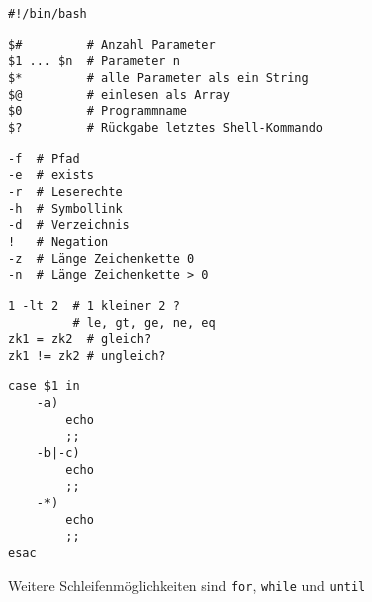 			\lstBash[1. Zeile]
			\begin{lstlisting}
#!/bin/bash
			\end{lstlisting}

			\begin{lstlisting}
$#         # Anzahl Parameter
$1 ... $n  # Parameter n
$*         # alle Parameter als ein String
$@         # einlesen als Array
$0         # Programmname
$?         # Rückgabe letztes Shell-Kommando
			\end{lstlisting}

			\begin{lstlisting}
-f  # Pfad
-e  # exists
-r  # Leserechte
-h  # Symbollink
-d  # Verzeichnis
!   # Negation
-z  # Länge Zeichenkette 0
-n  # Länge Zeichenkette > 0
			\end{lstlisting}

			\begin{lstlisting}
1 -lt 2  # 1 kleiner 2 ?
         # le, gt, ge, ne, eq
zk1 = zk2  # gleich?
zk1 != zk2 # ungleich?
			\end{lstlisting}

			\lstBash[Fallunterscheidung]
			\begin{lstlisting}
case $1 in
	-a)
		echo
		;;
	-b|-c)
		echo
		;;
	-*)
		echo
		;;
esac
			\end{lstlisting}
			Weitere Schleifenmöglichkeiten sind \texttt{for}, \texttt{while} und \texttt{until}
		

